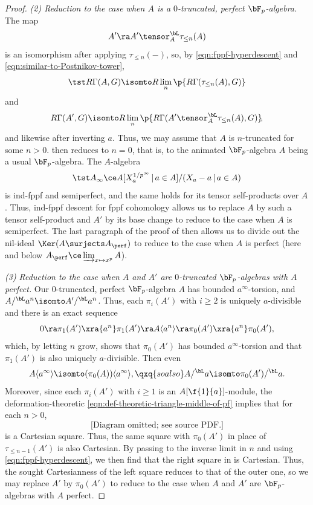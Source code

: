 \begin{proof}
\emph{(2) Reduction to the case when $A$ is a $0$-truncated, perfect $\bF_p$-algebra.}
The map
\[
A' \ra A' \tensor^\bL_A \tau_{\le n}(A)
\]
is an isomorphism after applying $\tau_{\le n}(-)$, so, by \eqref{eqn:fppf-hyperdescent} and \eqref{eqn:similar-to-Postnikov-tower},
\[
\tst R\Gamma(A, G) \isomto R\lim_n\p{R\Gamma(\tau_{\le n}(A), G)}
\]
and
\[
R\Gamma(A', G) \isomto R\lim_n\p{R\Gamma(A' \tensor_A^\bL \tau_{\le n}(A), G)}\!,
\]
and likewise after inverting $a$. Thus, we may assume that $A$ is $n$-truncated for some $n > 0$.  then reduces to $n = 0$, that is, to the animated $\bF_p$-algebra $A$ being a usual $\bF_p$-algebra. The $A$-algebra
\[
\tst A_\infty \ce A[X_a^{1/p^\infty}\, \vert\, a \in A]/(X_a - a\, \vert\, a \in A)
\]
is ind-fppf and semiperfect, and the same holds for its tensor self-products over $A$. Thus, ind-fppf descent for fppf cohomology allows us to replace $A$ by such a tensor self-product and $A'$ by its base change to reduce to the case when $A$ is semiperfect. The last paragraph of the proof of  then allows us to divide out the nil-ideal $\Ker(A\surjects A_\perf)$ to reduce to the case when $A$ is perfect (here and below $A_\perf \ce \varinjlim_{x \mapsto x^p} A$).

\emph{(3) Reduction to the case when $A$ and $A'$ are $0$-truncated $\bF_p$-algebras with $A$ perfect.}
Our $0$-truncated, perfect $\bF_p$-algebra $A$ has bounded $a^\infty$-torsion, and $A/^\bL a^n \isomto A'/^\bL a^n$. Thus, each $\pi_{i}(A')$ with $i \ge 2$ is uniquely $a$-divisible and there is an exact sequence
\[
0 \ra \pi_1(A') \xra{a^n} \pi_1(A') \ra A\langle a^n\rangle \ra \pi_0(A') \xra{a^n} \pi_0(A'),
\]
which, by letting $n$ grow, shows that $\pi_0(A')$ has bounded $a^\infty$-torsion and that $\pi_1(A')$ is also uniquely $a$-divisible. Then even
\[
A\langle a^\infty\rangle \isomto (\pi_0(A))\langle a^\infty\rangle, \qxq{so also} A/^\bL a \isomto \pi_0(A')/^\bL a.
\]
Moreover, since each $\pi_i(A')$ with $i \ge 1$ is an $A[\f{1}{a}]$-module, the deformation-theoretic \eqref{eqn:def-theoretic-triangle-middle-of-pf} implies that for each $n > 0$,
\[\text{[Diagram omitted; see source PDF.]}
\]
is a Cartesian square. Thus, the same square with $\pi_0(A')$ in place of $\tau_{\le n - 1}(A')$ is also Cartesian. By passing to the inverse limit in $n$ and using \eqref{eqn:fppf-hyperdescent}, we then find that the right square in
\be \label{eqn:two-Cartesian-squares-argument} \ba{}
\ea \ee
is Cartesian. Thus, the sought Cartesianness of the left square reduces to that of the outer one, %
so we may replace $A'$ by $\pi_0(A')$ to reduce to the case when $A$ and $A'$ are $\bF_p$-algebras with $A$ perfect.



\end{proof}

